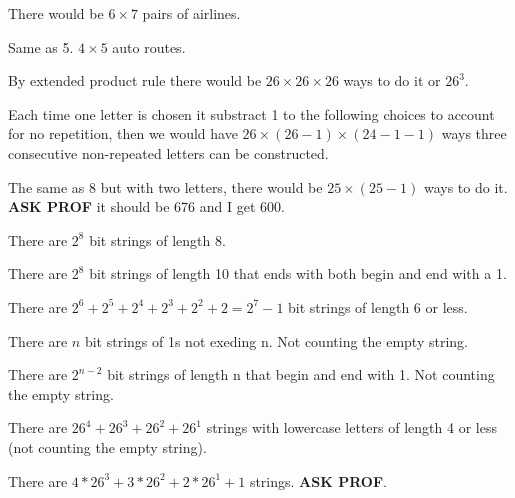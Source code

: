 \begin{exercise}
    There would be $6 \times 7$ pairs of airlines.
\end{exercise}

\begin{exercise}
    Same as 5. $4 \times 5$ auto routes.
\end{exercise}

\begin{exercise}
    By extended product rule there would be $26 \times 26 \times 26$ ways to do it or $26^3$.
\end{exercise}

\begin{exercise}
    Each time one letter is chosen it substract 1 to the following choices to account for no repetition, then we would have $26 \times (26 - 1) \times (24 - 1 - 1)$ ways three consecutive non-repeated letters can be constructed.
\end{exercise}

\begin{exercise}
    The same as 8 but with two letters, there would be $25 \times (25 - 1)$ ways to do it. \textbf{ASK PROF} it should be 676 and I get 600.
\end{exercise}

\begin{exercise}
    There are $2^8$ bit strings of length 8.
\end{exercise}

\begin{exercise}
    There are $2^8$ bit strings of length 10 that ends with both begin and end with a 1.
\end{exercise}

\begin{exercise}
    There are $2^6 + 2^5 + 2^4 + 2^3 + 2^2 + 2 = 2^7 -1$ bit strings of length 6 or less.
\end{exercise}

\begin{exercise}
    There are $n$ bit strings of 1s not exeding n. Not counting the empty string.
\end{exercise}

\begin{exercise}
    There are $2^{n-2}$ bit strings of length n that begin and end with 1. Not counting the empty string.
\end{exercise}

\begin{exercise}
    There are $26^4 + 26^3 + 26^2 + 26^1$ strings with lowercase letters of length 4 or less (not counting the empty string).
\end{exercise}

\begin{exercise}
    There are $4*26^3 + 3*26^2 + 2*26^1 + 1$ strings. \textbf{ASK PROF}.
\end{exercise}


